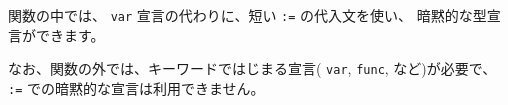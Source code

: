 関数の中では、 \texttt{var} 宣言の代わりに、短い \texttt{:=} の代入文を使い、
暗黙的な型宣言ができます。

なお、関数の外では、キーワードではじまる宣言( \texttt{var}, \texttt{func}, など)が必要で、
\texttt{:=} での暗黙的な宣言は利用できません。